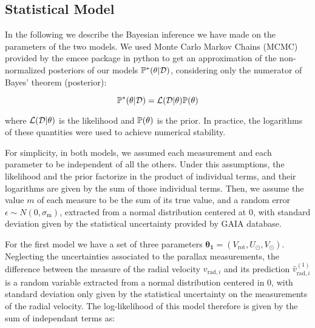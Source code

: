 \subsection{Statistical Model}\label{subsec:StatisticalModel}
In the following we describe the Bayesian inference we have made on the parameters of the two models. 
We used Monte Carlo Markov Chains (MCMC) provided by the emcee package in python 
to get an approximation of the non-normalized posteriors of our models 
$\mathbb{P}^{*}(\theta \vert \mathcal{D})$, considering only the numerator of Bayes' theorem (posterior):

\begin{equation}\label{Eq:NonNormPosterior}
    \mathbb{P}^{*}(\theta \vert \mathcal{D}) = \mathcal{L}(\mathcal{D} \vert \theta) \mathbb{P}(\theta)
\end{equation}

\noindent where $\mathcal{L}(\mathcal{D} \vert \theta)$ is the likelihood and $\mathbb{P}(\theta)$ is the prior. In practice, the logarithms of these quantities were used to achieve numerical stability.

For simplicity, in both models, we assumed each measurement and each parameter to be independent of all the others. Under this assumptions, the likelihood and the prior factorize in the product of individual terms, and their logarithms are given by the sum of those individual terms. Then, we assume the value $m$ of each measure to be  the sum of its true value, and a random error $\epsilon \sim N(0, \sigma_\text{m})$, extracted from a normal distribution centered at 0, with standard deviation given by the statistical uncertainty provided by GAIA database.

For the first model we have a set of three parameters $\mathbf{\theta_1} = (V_{\text{rot}}, U_{\odot}, V_{\odot})$. 
Neglecting the uncertainties associated to the parallax measurements, the difference between the measure of the radial velocity $v_{\text{rad}, i}$ and its prediction $\hat{v}^{(1)}_{\text{rad}, i}$ is a random variable extracted from a normal distribution centered in 0, with standard deviation only given by the statistical uncertainty on the measurements of the radial velocity. 
The log-likelihood of this model therefore is given by the sum of independant terms as:

